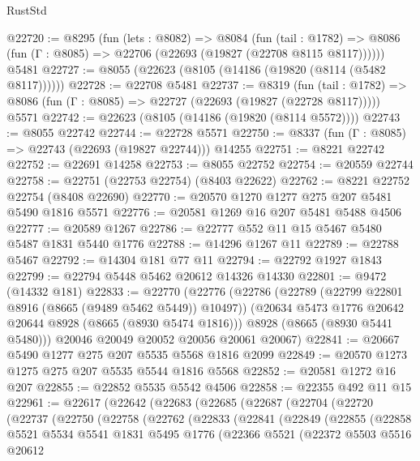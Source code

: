 \begin{lexlean}{RustStd}
\begin{coremodule}
@22720 := @8295
    (fun (lets : @8082) =>
    @8084
      (fun (tail : @1782) =>
      @8086 (fun (Γ : @8085) => @22706 (@22693 (@19827 (@22708 @8115 @8117))))))
    @5481
@22727 := @8055 (@22623 (@8105 (@14186 (@19820 (@8114 (@5482 @8117))))))
@22728 := @22708 @5481
@22737 := @8319
    (fun (tail : @1782) => @8086 (fun (Γ : @8085) => @22727 (@22693 (@19827 (@22728 @8117)))))
    @5571
@22742 := @22623 (@8105 (@14186 (@19820 (@8114 @5572))))
@22743 := @8055 @22742
@22744 := @22728 @5571
@22750 := @8337 (fun (Γ : @8085) => @22743 (@22693 (@19827 @22744))) @14255
@22751 := @8221 @22742
@22752 := @22691 @14258
@22753 := @8055 @22752
@22754 := @20559 @22744
@22758 := @22751 (@22753 @22754) (@8403 @22622)
@22762 := @8221 @22752 @22754 (@8408 @22690)
@22770 := @20570 @1270 @1277 @275 @207 @5481 @5490 @1816 @5571
@22776 := @20581 @1269 @16 @207 @5481 @5488 @4506
@22777 := @20589 @1267
@22786 := @22777 @552 @11 @15 @5467 @5480 @5487 @1831 @5440 @1776
@22788 := @14296 @1267 @11
@22789 := @22788 @5467
@22792 := @14304 @181 @77 @11
@22794 := @22792 @1927 @1843
@22799 := @22794 @5448 @5462 @20612 @14326 @14330
@22801 := @9472 (@14332 @181)
@22833 := @22770
    (@22776
      (@22786
        (@22789 (@22799 @22801 @8916 (@8665 (@9489 @5462 @5449)) @10497))
        (@20634 @5473 @1776 @20642 @20644 @8928 (@8665 (@8930 @5474 @1816)))
        @8928
        (@8665 (@8930 @5441 @5480)))
      @20046
      @20049
      @20052
      @20056
      @20061
      @20067)
@22841 := @20667 @5490 @1277 @275 @207 @5535 @5568 @1816 @2099
@22849 := @20570 @1273 @1275 @275 @207 @5535 @5544 @1816 @5568
@22852 := @20581 @1272 @16 @207
@22855 := @22852 @5535 @5542 @4506
@22858 := @22355 @492 @11 @15
@22961 := @22617
    (@22642
      (@22683
        (@22685
          (@22687
            (@22704
              (@22720
                (@22737
                  (@22750
                    (@22758
                      (@22762
                        (@22833
                          (@22841
                            (@22849
                              (@22855
                                (@22858
                                  @5521
                                  @5534
                                  @5541
                                  @1831
                                  @5495
                                  @1776
                                  (@22366
                                    @5521
                                    (@22372
                                      @5503
                                      @5516
                                      @20612

\end{coremodule}
\end{lexlean}
